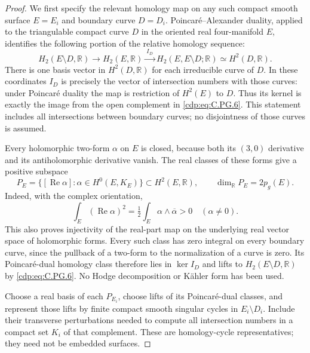 \begin{proof}
We first specify the relevant homology map on
any such compact smooth surface $E=E_i$ and
boundary curve $D=D_i$. Poincar\'e--Alexander
duality, applied to the triangulable compact
curve $D$ in the oriented real four-manifold
$E$, identifies the following portion of the
relative homology sequence:
\[
 H_2(E\setminus D,\mathbb R)\longrightarrow
 H_2(E,\mathbb R)\xrightarrow{\ I_D\ }
 H_2(E,E\setminus D;\mathbb R)
       \simeq H^2(D,\mathbb R).
                                                               \tag{C.PG.6}\label{cdp:eq:C.PG.6}
\]
There is one basis vector in $H^2(D,\mathbb R)$
for each irreducible curve of $D$. In these
coordinates $I_D$ is precisely the vector of
intersection numbers with those curves: under
Poincar\'e duality the map is restriction of
$H^2(E)$ to $D$. Thus its kernel is exactly
the image from the open complement in
\eqref{cdp:eq:C.PG.6}. This statement includes all
intersections between boundary curves; no
disjointness of those curves is assumed.

Every holomorphic two-form $\alpha$ on $E$
is closed, because both its $(3,0)$ derivative
and its antiholomorphic derivative vanish.
The real classes of these forms give a
positive subspace
\[
 P_E=\{[\operatorname{Re}\alpha]:
                       \alpha\in H^0(E,K_E)\}
       \subset H^2(E,\mathbb R),
 \qquad \dim_{\mathbb R}P_E=2p_g(E).
                                                               \tag{C.PG.7}\label{cdp:eq:C.PG.7}
\]
Indeed, with the complex orientation,
\[
 \int_E(\operatorname{Re}\alpha)^2
       =\tfrac12\int_E\alpha\wedge\overline\alpha>0
                      \quad (\alpha\ne0).
                                                               \tag{C.PG.8}\label{cdp:eq:C.PG.8}
\]
This also proves injectivity of the real-part
map on the underlying real vector space of
holomorphic forms. Every such class has zero
integral on every boundary curve, since the
pullback of a two-form to the normalization
of a curve is zero. Its Poincar\'e-dual
homology class therefore lies in
$\ker I_D$ and lifts to
$H_2(E\setminus D,\mathbb R)$ by \eqref{cdp:eq:C.PG.6}.
No Hodge decomposition or K\"ahler form has
been used.

Choose a real basis of each $P_{E_i}$,
choose lifts of its Poincar\'e-dual classes,
and represent those lifts by finite compact
smooth singular cycles in $E_i\setminus D_i$.
Include their transverse perturbations needed
to compute all intersection numbers in a
compact set $K_i$ of that complement. These
are homology-cycle representatives; they
need not be embedded surfaces.


\end{proof}
